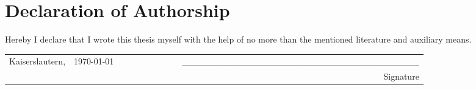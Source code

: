 \section*{Declaration of Authorship}
Hereby I declare that I wrote this thesis myself with the help of no more than the mentioned
literature and auxiliary means.
\newline
\newline
\begin{table}[h]
\begin{tabular}{lllllllllr}
Kaiserslautern, & \today & & & & & & & & \_\_\_\_\_\_\_\_\_\_\_\_\_\_\_\_\_\_\_\_\_\_\_\_\_\_\_\_\_\_\_\_\_\_\_\_\_ \\
 & & & & & & & & & {\small Signature }                                       
\end{tabular}
\end{table}

\newpage
\thispagestyle{empty}
\section*{}
\newpage
